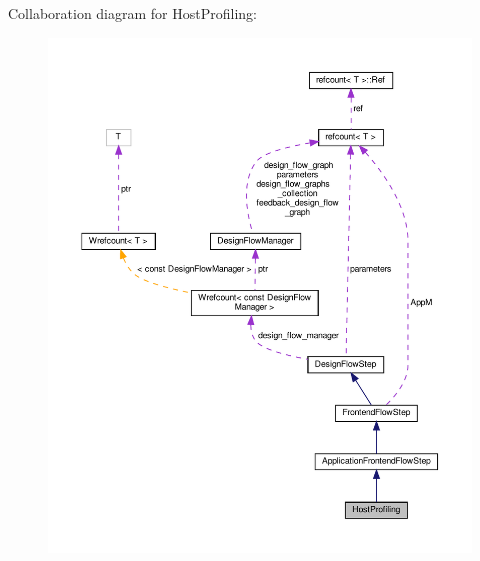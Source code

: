 Collaboration diagram for Host\+Profiling\+:
\nopagebreak
\begin{figure}[H]
\begin{center}
\leavevmode
\includegraphics[width=350pt]{da/d89/classHostProfiling__coll__graph}
\end{center}
\end{figure}

